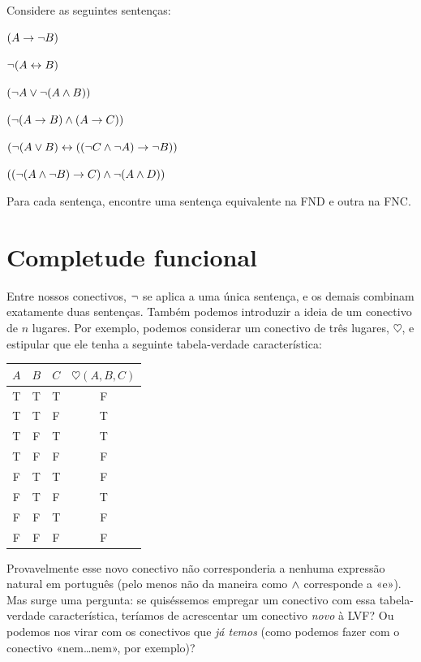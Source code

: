 \practiceproblems
\problempart
\label{pr.DNF}
Considere as seguintes sentenças:
	\begin{compactlist}
		\item $(A \rightarrow \neg B)$
		\item $\neg (A \leftrightarrow B)$
		\item $(\neg A \vee \neg (A \wedge B))$
		\item $(\neg (A \rightarrow B ) \wedge (A \rightarrow C))$
		\item $(\neg (A \vee B) \leftrightarrow ((\neg C \wedge \neg A) \rightarrow \neg B))$
		\item $((\neg (A \wedge \neg B) \rightarrow C) \wedge \neg (A \wedge D))$
	\end{compactlist}
Para cada sentença, encontre uma sentença equivalente na FND e outra na FNC.

\chapter{Completude funcional}\label{c:FunctionalCompleteness}

Entre nossos conectivos, $\neg$ se aplica a uma única sentença, e os demais combinam exatamente duas sentenças. Também podemos introduzir a ideia de um conectivo de $n$ lugares. Por exemplo, podemos considerar um conectivo de três lugares, $\heartsuit$, e estipular que ele tenha a seguinte tabela-verdade característica:
\begin{center}
\begin{tabular}{c c c | c}
$A$ & $B$ & $C$ & $\heartsuit(A,B,C)$\\
\hline
 T & T & T & F \\
 T & T & F & T \\
 T & F & T & T \\
 T & F & F & F \\
 F & T & T & F \\
 F & T & F & T \\
 F & F & T & F \\
 F & F & F & F
\end{tabular}
\end{center}
Provavelmente esse novo conectivo não corresponderia a nenhuma expressão natural em português (pelo menos não da maneira como $\wedge$ corresponde a «e»). Mas surge uma pergunta: se quiséssemos empregar um conectivo com essa tabela-verdade característica, teríamos de acrescentar um conectivo \emph{novo} à LVF? Ou podemos nos virar com os conectivos que \emph{já temos} (como podemos fazer com o conectivo «nem\dots nem», por exemplo)?

